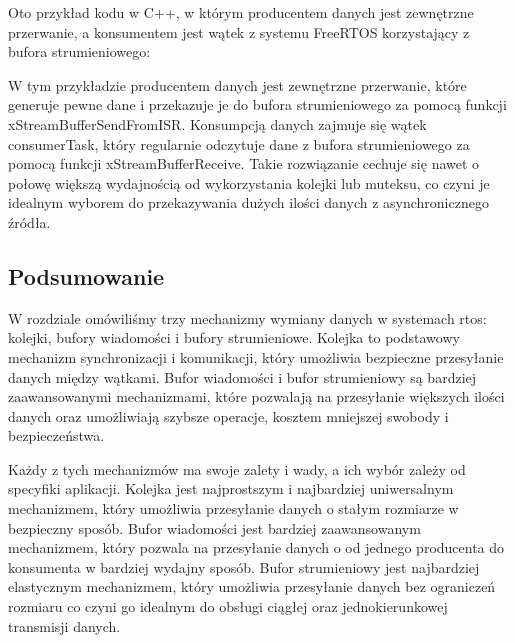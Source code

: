Oto przykład kodu w C++, w którym producentem danych jest zewnętrzne przerwanie,
a konsumentem jest wątek z systemu FreeRTOS korzystający z bufora strumieniowego:

W tym przykładzie producentem danych jest zewnętrzne przerwanie, które generuje pewne dane i przekazuje je do bufora strumieniowego za pomocą
funkcji xStreamBufferSendFromISR. Konsumpcją danych zajmuje się wątek consumerTask, który regularnie odczytuje dane z bufora strumieniowego
za pomocą funkcji xStreamBufferReceive. Takie rozwiązanie cechuje się nawet o połowę większą wydajnością od wykorzystania kolejki lub muteksu,
co czyni je idealnym wyborem do przekazywania dużych ilości danych z asynchronicznego źródła.

\subsection{Podsumowanie}
W rozdziale omówiliśmy trzy mechanizmy wymiany danych w systemach \gls{rtos}: kolejki, bufory wiadomości i bufory strumieniowe.
Kolejka to podstawowy mechanizm synchronizacji i komunikacji, który umożliwia bezpieczne przesyłanie danych między wątkami.
Bufor wiadomości i bufor strumieniowy są bardziej zaawansowanymi mechanizmami, które pozwalają na przesyłanie większych ilości danych
oraz umożliwiają szybsze operacje, kosztem mniejszej swobody i bezpieczeństwa.

Każdy z tych mechanizmów ma swoje zalety i wady, a ich wybór zależy od specyfiki aplikacji. Kolejka jest najprostszym i najbardziej uniwersalnym mechanizmem,
który umożliwia przesyłanie danych o stałym rozmiarze w bezpieczny sposób. Bufor wiadomości jest bardziej zaawansowanym mechanizmem, który pozwala na
przesyłanie danych o od jednego producenta do konsumenta w bardziej wydajny sposób. Bufor strumieniowy jest najbardziej elastycznym mechanizmem,
który umożliwia przesyłanie danych bez ograniczeń rozmiaru co czyni go idealnym do obsługi ciągłej oraz jednokierunkowej transmisji danych.